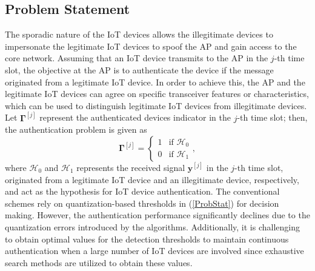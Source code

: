 \documentclass[journal,10pt]{IEEEtran}
\begin{document}
\subsection{Problem Statement}
The sporadic nature of the IoT devices allows the illegitimate devices to impersonate the legitimate IoT devices to spoof the AP and gain access to the core network. Assuming that an IoT device transmits to the AP in the $j$-th time slot, the objective at the AP is to authenticate the device if the message originated from a legitimate IoT device. In order to achieve this, the AP and the legitimate IoT devices can agree on specific transceiver features or characteristics, which can be used to distinguish legitimate IoT devices from illegitimate devices. Let $\mathbf{\Gamma}^{[j]}$ represent the authenticated devices indicator in the $j$-th time slot; then, the authentication problem is given as
\begin{equation} \label{ProbStat}
    \mathbf{\Gamma}^{[j]} = 
    \begin{cases}
        1 & \text{if } \mathcal{H}_0\\
        0 & \text{if } \mathcal{H}_1
    \end{cases}
    ,
\end{equation}
where $\mathcal{H}_0$ and $\mathcal{H}_1$ represents the received signal $\mathbf{y}^{[j]}$ in the $j$-th time slot, originated from a legitimate IoT device and an illegitimate device, respectively, and act as the hypothesis for IoT device authentication. The conventional schemes \cite{liu2013two, liu2016physical, zhang2020physical} rely on quantization-based thresholds in (\ref{ProbStat}) for decision making. However, the authentication performance significantly declines due to the quantization errors introduced by the algorithms. Additionally, it is challenging to obtain optimal values for the detection thresholds to maintain continuous authentication when a large number of IoT devices are involved since exhaustive search methods are utilized to obtain these values.  
\end{document}
